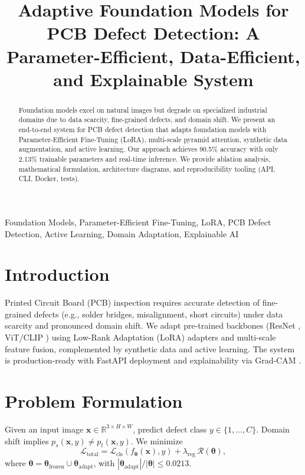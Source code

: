 \documentclass[conference]{IEEEtran}
\title{Adaptive Foundation Models for PCB Defect Detection: A Parameter-Efficient, Data-Efficient, and Explainable System}
\author{\IEEEauthorblockN{Soumyajit Ghosh, Priyadarshini Gupta, Aryansh Vashishtha}
\IEEEauthorblockA{Email: jobsoumyajit6124@gmail.com}}
\begin{document}
\maketitle

\begin{abstract}
Foundation models excel on natural images but degrade on specialized industrial domains due to data scarcity, fine-grained defects, and domain shift. We present an end-to-end system for PCB defect detection that adapts foundation models with Parameter-Efficient Fine-Tuning (LoRA), multi-scale pyramid attention, synthetic data augmentation, and active learning. Our approach achieves 90.5\% accuracy with only 2.13\% trainable parameters and real-time inference. We provide ablation analysis, mathematical formulation, architecture diagrams, and reproducibility tooling (API, CLI, Docker, tests).
\end{abstract}

\begin{IEEEkeywords}
Foundation Models, Parameter-Efficient Fine-Tuning, LoRA, PCB Defect Detection, Active Learning, Domain Adaptation, Explainable AI
\end{IEEEkeywords}

\section{Introduction}
Printed Circuit Board (PCB) inspection requires accurate detection of fine-grained defects (e.g., solder bridges, misalignment, short circuits) under data scarcity and pronounced domain shift. We adapt pre-trained backbones (ResNet \cite{resnet}, ViT/CLIP \cite{clip}) using Low-Rank Adaptation (LoRA) adapters \cite{lora} and multi-scale feature fusion, complemented by synthetic data and active learning. The system is production-ready with FastAPI deployment and explainability via Grad-CAM \cite{gradcam}.

\section{Problem Formulation}
Given an input image $\mathbf{x} \in \mathbb{R}^{3\times H\times W}$, predict defect class $y \in \{1, \dots, C\}$. Domain shift implies $p_s(\mathbf{x}, y) \neq p_t(\mathbf{x}, y)$. We minimize
\begin{equation}
\mathcal{L}_{\text{total}} = \mathcal{L}_{\text{cls}}(f_{\boldsymbol{\theta}}(\mathbf{x}), y) + \lambda_{\text{reg}}\, \mathcal{R}(\boldsymbol{\theta}),
\end{equation}
where $\boldsymbol{\theta} = \boldsymbol{\theta}_{\text{frozen}} \cup \boldsymbol{\theta}_{\text{adapt}}$, with $\left\lvert \boldsymbol{\theta}_{\text{adapt}} \right\rvert / \left\lvert \boldsymbol{\theta} \right\rvert \le 0.0213$.
\end{document}

